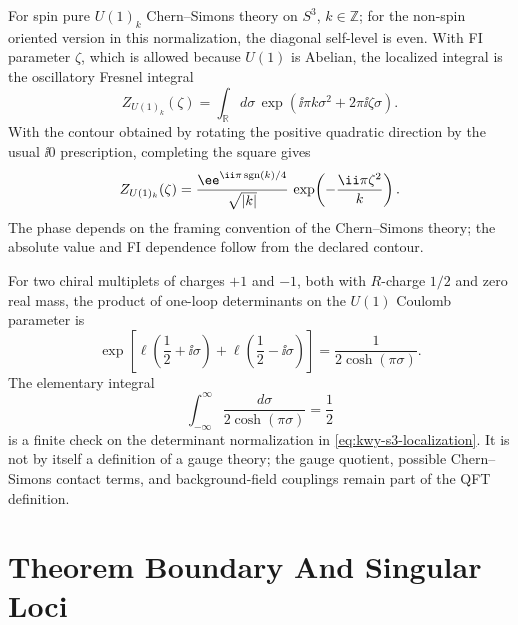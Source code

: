 \begin{example}
\label{ex:s3-u1-cs-fresnel}
For spin pure \(U(1)_k\) Chern--Simons theory on \(S^3\), \(k\in\mathbb Z\);
for the non-spin oriented version in this normalization, the diagonal
self-level is even.  With FI parameter \(\zeta\), which is allowed because
\(U(1)\) is Abelian, the localized integral is the oscillatory Fresnel integral
\[
  Z_{U(1)_k}(\zeta)
  =
  \int_{\mathbb R} d\sigma\,
  \exp\!\left(\ii\pi k\sigma^2+2\pi\ii\zeta\sigma\right).
\]
With the contour obtained by rotating the positive quadratic direction by the
usual \(\ii0\) prescription, completing the square gives
\begin{equation}
  Z_{U(1)_k}(\zeta)
  =
  \frac{\ee^{\ii\pi\,{\rm sgn}(k)/4}}{\sqrt{|k|}}\,
  \exp\!\left(-\frac{\ii\pi\zeta^2}{k}\right).
  \label{eq:s3-u1-cs-fresnel}
\end{equation}
The phase depends on the framing convention of the Chern--Simons theory; the
absolute value and FI dependence follow from the declared contour.
\end{example}

\begin{example}
\label{ex:s3-chiral-pair-integral}
For two chiral multiplets of charges \(+1\) and \(-1\), both with
\(R\)-charge \(1/2\) and zero real mass, the product of one-loop determinants
on the \(U(1)\) Coulomb parameter is
\[
  \exp\!\left[
    \ell\!\left(\frac12+\ii\sigma\right)
    +
    \ell\!\left(\frac12-\ii\sigma\right)
  \right]
  =
  \frac1{2\cosh(\pi\sigma)}.
\]
The elementary integral
\begin{equation}
  \int_{-\infty}^{\infty}
  \frac{d\sigma}{2\cosh(\pi\sigma)}
  =
  \frac12
  \label{eq:s3-chiral-pair-integral}
\end{equation}
is a finite check on the determinant normalization in
\eqref{eq:kwy-s3-localization}.  It is not by itself a definition of a gauge
theory; the gauge quotient, possible Chern--Simons contact terms, and
background-field couplings remain part of the QFT definition.
\end{example}

\section{Theorem Boundary And Singular Loci}

